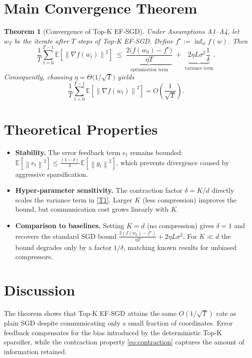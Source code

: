 \documentclass{article}
\newtheorem{theorem}{Theorem}
\newcommand{\E}{\mathbb{E}}
\newcommand{\norm}[1]{\left\lVert#1\right\rVert}
\begin{document}
\section*{Main Convergence Theorem}
\begin{theorem}[Convergence of Top‑K EF‑SGD]\label{thm:main}
Under Assumptions A1–A4, let $w_T$ be the iterate after $T$ steps of
Top‑K EF‑SGD.  Define $f^\star:=\inf_{w}f(w)$.  Then
\[
\frac{1}{T}\sum_{t=0}^{T-1}\E\!\left[\norm{\nabla f(w_t)}^{2}\right]
\;\le\;
\underbrace{\frac{2\bigl(f(w_0)-f^\star\bigr)}{\eta T}}_{\displaystyle\text{optimization term}}
\;+\;
\underbrace{2\eta L\sigma^{2}\frac{1}{\delta}}_{\displaystyle\text{variance term}} .
\tag{T1}
\]
Consequently, choosing $\eta =\Theta\!\bigl(1/\sqrt{T}\bigr)$ yields
\[
\frac{1}{T}\sum_{t=0}^{T-1}\E\!\left[\norm{\nabla f(w_t)}^{2}\right]
= O\!\left(\frac{1}{\sqrt{T}}\right).
\]
\end{theorem}

\section*{Theoretical Properties}
\begin{itemize}
\item \textbf{Stability.}  The error feedback term $e_t$ remains bounded:
$\E[\norm{e_t}^{2}]\le \frac{(1-\delta)}{\delta}\,\E[\norm{g_t}^{2}]$,
which prevents divergence caused by aggressive sparsification.
\item \textbf{Hyper‑parameter sensitivity.}
  The contraction factor $\delta=K/d$ directly scales the variance term in
  \eqref{T1}.  Larger $K$ (less compression) improves the bound, but
  communication cost grows linearly with $K$.
\item \textbf{Comparison to baselines.}
  Setting $K=d$ (no compression) gives $\delta=1$ and recovers the standard
  SGD bound $\frac{2(f(w_0)-f^\star)}{\eta T}+2\eta L\sigma^{2}$.
  For $K\ll d$ the bound degrades only by a factor $1/\delta$, matching
  known results for unbiased compressors.
\end{itemize}

\section*{Discussion}
The theorem shows that Top‑K EF‑SGD attains the same $O(1/\sqrt{T})$ rate as
plain SGD despite communicating only a small fraction of coordinates.
Error feedback compensates for the bias introduced by the deterministic
Top‑K sparsifier, while the contraction property \eqref{eq:contraction}
captures the amount of information retained.
\end{document}
